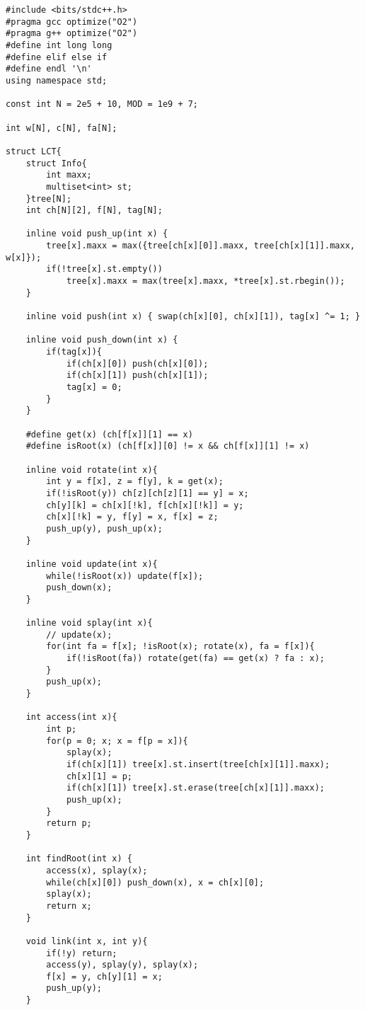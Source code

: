 \documentclass[]{article}
\begin{document}
\begin{verbatim}
#include <bits/stdc++.h>
#pragma gcc optimize("O2")
#pragma g++ optimize("O2")
#define int long long
#define elif else if
#define endl '\n'
using namespace std;

const int N = 2e5 + 10, MOD = 1e9 + 7;

int w[N], c[N], fa[N];

struct LCT{
    struct Info{
        int maxx;
        multiset<int> st;
    }tree[N];
    int ch[N][2], f[N], tag[N];

    inline void push_up(int x) { 
        tree[x].maxx = max({tree[ch[x][0]].maxx, tree[ch[x][1]].maxx, w[x]}); 
        if(!tree[x].st.empty())
            tree[x].maxx = max(tree[x].maxx, *tree[x].st.rbegin());
    }

    inline void push(int x) { swap(ch[x][0], ch[x][1]), tag[x] ^= 1; }

    inline void push_down(int x) {
        if(tag[x]){
            if(ch[x][0]) push(ch[x][0]);
            if(ch[x][1]) push(ch[x][1]);
            tag[x] = 0;
        }
    }

    #define get(x) (ch[f[x]][1] == x)
    #define isRoot(x) (ch[f[x]][0] != x && ch[f[x]][1] != x)

    inline void rotate(int x){
        int y = f[x], z = f[y], k = get(x);
        if(!isRoot(y)) ch[z][ch[z][1] == y] = x;
        ch[y][k] = ch[x][!k], f[ch[x][!k]] = y;
        ch[x][!k] = y, f[y] = x, f[x] = z;
        push_up(y), push_up(x);
    }

    inline void update(int x){
        while(!isRoot(x)) update(f[x]);
        push_down(x);
    }

    inline void splay(int x){
        // update(x);
        for(int fa = f[x]; !isRoot(x); rotate(x), fa = f[x]){
            if(!isRoot(fa)) rotate(get(fa) == get(x) ? fa : x);
        }
        push_up(x);
    }

    int access(int x){
        int p;
        for(p = 0; x; x = f[p = x]){
            splay(x);
            if(ch[x][1]) tree[x].st.insert(tree[ch[x][1]].maxx);
            ch[x][1] = p;
            if(ch[x][1]) tree[x].st.erase(tree[ch[x][1]].maxx);
            push_up(x);
        }
        return p;
    }

    int findRoot(int x) {
        access(x), splay(x);
        while(ch[x][0]) push_down(x), x = ch[x][0];
        splay(x);
        return x;
    }

    void link(int x, int y){
        if(!y) return;
        access(y), splay(y), splay(x);
        f[x] = y, ch[y][1] = x;
        push_up(y);
    }


\end{verbatim}
\end{document}
